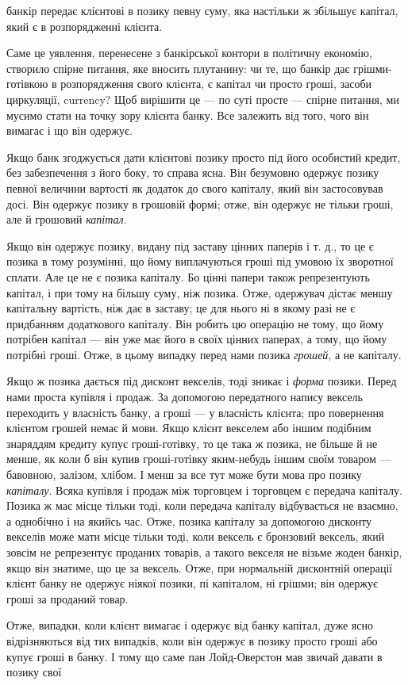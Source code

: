 \parcont{}  %
банкір передає клієнтові в позику певну суму, яка настільки ж
збільшує капітал, який є в розпорядженні клієнта.

Саме це уявлення, перенесене з банкірської контори в політичну економію, створило спірне питання,
яке вносить плутанину: чи те, що банкір дає грішми-готівкою в розпорядження
свого клієнта, є капітал чи просто гроші, засоби циркуляції,
currency? Щоб вирішити це — по суті просте — спірне питання,
ми мусимо стати на точку зору клієнта банку. Все залежить
від того, чого він вимагає і що він одержує.

Якщо банк згоджується дати клієнтові позику просто під
його особистий кредит, без забезпечення з його боку, то справа
ясна. Він безумовно одержує позику певної величини вартості
як додаток до свого капіталу, який він застосовував досі. Він
одержує позику в грошовій формі; отже, він одержує не тільки
гроші, але й грошовий \emph{капітал}.

Якщо він одержує позику, видану під заставу цінних паперів і т. д., то це є позика в тому розумінні,
що йому виплачуються гроші під умовою їх зворотної сплати. Але це не є
позика капіталу. Бо цінні папери також репрезентують капітал,
і при тому на більшу суму, ніж позика. Отже, одержувач дістає меншу капітальну вартість, ніж дає в
заставу; це для нього
ні в якому разі не є придбанням додаткового капіталу. Він робить цю операцію не тому, що йому
потрібен капітал — він уже
має його в своїх цінних паперах, а тому, що йому потрібні гроші.
Отже, в цьому випадку перед нами позика \emph{грошей}, а не капіталу.

Якщо ж позика дається під дисконт векселів, тоді зникає і \emph{форма}
позики. Перед нами проста купівля і продаж. За допомогою передатного напису вексель переходить у
власність банку, а гроші — у власність клієнта; про повернення клієнтом грошей немає й мови. Якщо
клієнт векселем або іншим подібним знаряддям
кредиту купує гроші-готівку, то це така ж позика, не більше
й не менше, як коли б він купив гроші-готівку яким-небудь
іншим своїм товаром — бавовною, залізом, хлібом. І менш за
все тут може бути мова про позику \emph{капіталу}. Всяка купівля і продаж між торговцем і торговцем є
передача капіталу.
Позика ж має місце тільки тоді, коли передача капіталу відбувається не взаємно, а однобічно і на
якийсь час. Отже, позика
капіталу за допомогою дисконту векселів може мати місце
тільки тоді, коли вексель є бронзовий вексель, який зовсім не
репрезентує проданих товарів, а такого векселя не візьме жоден
банкір, якщо він знатиме, що це за вексель. Отже, при нормальній дисконтній операції клієнт банку не
одержує ніякої позики,
пі капіталом, ні грішми; він одержує гроші за проданий товар.

Отже, випадки, коли клієнт вимагає і одержує від банку
капітал, дуже ясно відрізняються від тих випадків, коли він
одержує в позику просто гроші або купує гроші в банку. І тому
що саме пан Лойд-Оверстон мав звичай давати в позику свої
\parbreak{}  %
